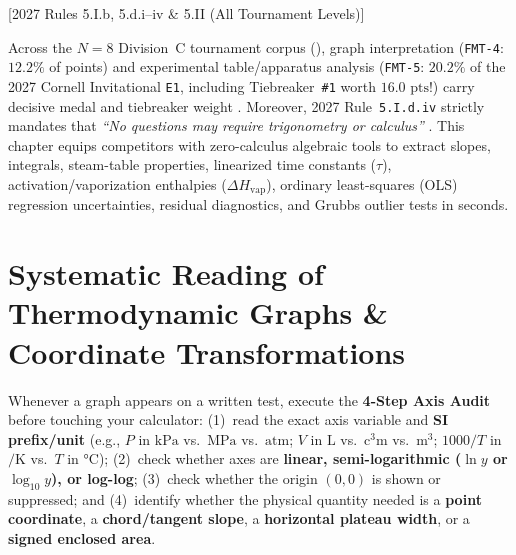 [2027 Rules 5.I.b, 5.d.i--iv \& 5.II (All Tournament Levels)]

Across the $N = 8$ Division~C tournament corpus (), graph interpretation (\texttt{FMT-4}: $12.2\%$ of points) and experimental table/apparatus analysis (\texttt{FMT-5}: $20.2\%$ of the 2027 Cornell Invitational \texttt{E1}, including Tiebreaker~\texttt{\#1} worth $16.0\text{ pts}$!) carry decisive medal and tiebreaker weight . Moreover, 2027 Rule~\texttt{5.I.d.iv} strictly mandates that \emph{``No questions may require trigonometry or calculus''} . This chapter equips competitors with zero-calculus algebraic tools to extract slopes, integrals, steam-table properties, linearized time constants ($\tau$), activation/vaporization enthalpies ($\Delta H_{\mathrm{vap}}$), ordinary least-squares (OLS) regression uncertainties, residual diagnostics, and Grubbs outlier tests in seconds.

\section{Systematic Reading of Thermodynamic Graphs \& Coordinate Transformations}\label{sec:18.1}

Whenever a graph appears on a written test, execute the \textbf{4-Step Axis Audit} before touching your calculator: (1)~read the exact axis variable and \textbf{SI prefix/unit} (e.g., $P$ in $\si{\kilo\pascal}$ vs.\ $\si{\mega\pascal}$ vs.\ $\si{\text{atm}}$; $V$ in $\si{\liter}$ vs.\ $\si{\cubic\centi\meter}$ vs.\ $\si{\cubic\meter}$; $1000/T$ in $\si{\per\kelvin}$ vs.\ $T$ in $\si{\celsius}$); (2)~check whether axes are \textbf{linear, semi-logarithmic ($\ln y$ or $\log_{10} y$), or log-log}; (3)~check whether the origin $(0,0)$ is shown or suppressed; and (4)~identify whether the physical quantity needed is a \textbf{point coordinate}, a \textbf{chord/tangent slope}, a \textbf{horizontal plateau width}, or a \textbf{signed enclosed area}.

